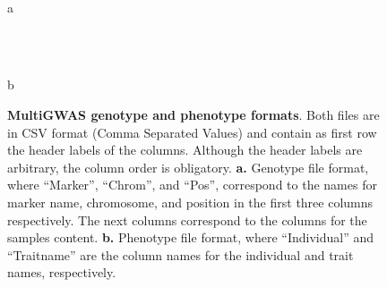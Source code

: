 \documentclass{article}
\begin{document}
\begin{figure}[H]
\begin{centering}
\begin{minipage}[t]{0.6\columnwidth}%
\begin{center}
\\
a
\par\end{center}%
\end{minipage}~~~~~~~~~%
\begin{minipage}[t]{0.3\columnwidth}%
\begin{center}
\\
b
\par\end{center}%
\end{minipage}
\par\end{centering}
\begin{centering}
\par\end{centering}
\caption{\textbf{MultiGWAS genotype and phenotype formats}. Both files are in CSV format (Comma Separated Values) and contain as first row the header labels of the columns. Although the header labels are arbitrary, the column order is obligatory. \textbf{a.} Genotype file format, where ``Marker'', ``Chrom'', and ``Pos'', correspond to the names for marker name, chromosome, and position in the first three columns respectively. The next columns correspond to the columns for the samples content. \textbf{b.} Phenotype file format, where ``Individual'' and ``Traitname'' are the column names for the individual and trait names, respectively.\label{fig:File-Formats}}
\end{figure}
\end{document}

